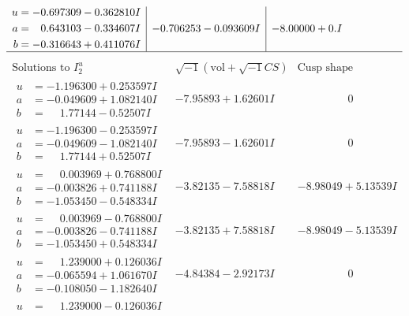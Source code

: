 \documentclass[1p]{elsarticle_modified}
\theoremstyle{definition}
\newcommand{\I}{\sqrt{-1}}
\begin{document}
$$\begin{array}{c|c|c}
\begin{aligned}
u &= -0.697309 - 0.362810 I \\
a &= \phantom{-}0.643103 - 0.334607 I \\
b &= -0.316643 + 0.411076 I\end{aligned}
 & -0.706253 - 0.093609 I & -8.00000 + 0. I\phantom{ +0.000000I}\\
 \hline 
 \end{array}$$\newpage$$\begin{array}{c|c|c}  
\text{Solutions to }I^u_{2}& \I (\text{vol} + \sqrt{-1}CS) & \text{Cusp shape}\\
 \hline 
\begin{aligned}
u &= -1.196300 + 0.253597 I \\
a &= -0.049609 + 1.082140 I \\
b &= \phantom{-}1.77144 - 0.52507 I\end{aligned}
 & -7.95893 + 1.62601 I & \phantom{-0.000000 } 0 \\ \hline\begin{aligned}
u &= -1.196300 - 0.253597 I \\
a &= -0.049609 - 1.082140 I \\
b &= \phantom{-}1.77144 + 0.52507 I\end{aligned}
 & -7.95893 - 1.62601 I & \phantom{-0.000000 } 0 \\ \hline\begin{aligned}
u &= \phantom{-}0.003969 + 0.768800 I \\
a &= -0.003826 + 0.741188 I \\
b &= -1.053450 - 0.548334 I\end{aligned}
 & -3.82135 - 7.58818 I & -8.98049 + 5.13539 I \\ \hline\begin{aligned}
u &= \phantom{-}0.003969 - 0.768800 I \\
a &= -0.003826 - 0.741188 I \\
b &= -1.053450 + 0.548334 I\end{aligned}
 & -3.82135 + 7.58818 I & -8.98049 - 5.13539 I \\ \hline\begin{aligned}
u &= \phantom{-}1.239000 + 0.126036 I \\
a &= -0.065594 + 1.061670 I \\
b &= -0.108050 - 1.182640 I\end{aligned}
 & -4.84384 - 2.92173 I & \phantom{-0.000000 } 0 \\ \hline\begin{aligned}
u &= \phantom{-}1.239000 - 0.126036 I \\

\end{aligned}
\end{array}$$
\end{document}
